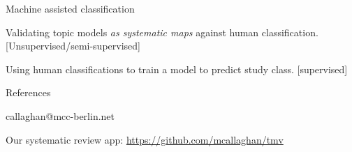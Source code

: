 \documentclass[9pt]{beamer}
\begin{document}
\begin{frame}{Machine assisted classification}

Validating topic models \textit{as systematic maps} against human classification. [Unsupervised/semi-supervised]

\bigskip

Using human classifications to train a model to predict study class. [supervised]

\end{frame}


\begin{frame}{References}

callaghan@mcc-berlin.net

\medskip


Our systematic review app: \url{https://github.com/mcallaghan/tmv} 

\medskip


\medskip


%

\end{frame}
\end{document}
